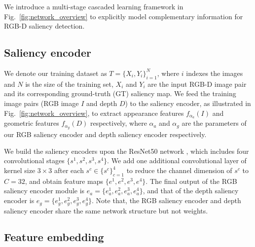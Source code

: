 \documentclass[10pt,twocolumn,letterpaper]{article}
\begin{document}
We introduce a multi-stage cascaded learning
framework in Fig.~\ref{fig:network_overview} to explicitly model 
complementary information for RGB-D saliency detection.


\subsection{Saliency encoder}
We denote our training dataset as $T=\{X_i,Y_i\}_{i=1}^N$, where $i$ indexes the images and $N$ is the size of the training set, $X_i$ and $Y_i$ are the input RGB-D image pair and its
corresponding ground-truth (GT) saliency map.
We feed the training image pairs (RGB image $I$ and
depth $D$) to the saliency encoder,
as illustrated in Fig.~\ref{fig:network_overview}, to extract appearance features $f_{\alpha_a}(I)$ and geometric features $f_{\alpha_g}(D)$ respectively, where $\alpha_a$ and $\alpha_g$ are the parameters of our RGB saliency encoder and depth saliency encoder respectively.

We build the saliency encoders upon the ResNet50 network \cite{ResHe2015}, which includes four convolutional stages $\{s^1,s^2,s^3, s^4\}$. We add one additional convolutional layer of kernel size $3\times3$ after each $s^c \in \{s^c\}_{c=1}^4$ to reduce the channel dimension of $s^c$ to $C=32$, and obtain feature maps $\{e^1,e^2,e^3,e^4\}$.
The final output of the RGB saliency encoder module is $e_a=\{e_a^1,e_a^2,e_a^3,e_a^4\}$, and that of the depth saliency encoder is $e_g=\{e_g^1,e_g^2,e_g^3,e_g^4\}$. Note that, the RGB saliency encoder and depth saliency encoder share the same network structure but not weights.









\subsection{Feature embedding}
\label{latent_feature_sec}
\end{document}
